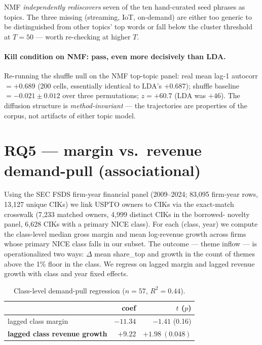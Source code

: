 \documentclass[11pt]{report}
\begin{document}
\noindent NMF \emph{independently rediscovers} seven of the ten hand-curated
seed phrases as topics. The three missing (streaming, IoT, on-demand) are
either too generic to be distinguished from other topics' top words or fall
below the cluster threshold at $T = 50$ --- worth re-checking at higher $T$.

\paragraph{Kill condition on NMF: pass, even more decisively than LDA.}
Re-running the shuffle null on the NMF top-topic panel: real mean lag-1
autocorr $= \mathbf{+0.689}$ (200 cells, essentially identical to LDA's
$+0.687$); shuffle baseline $= -0.021 \pm 0.012$ over three permutations;
\textbf{$z = +60.7$} (LDA was $+46$). The diffusion structure is
\emph{method-invariant} --- the trajectories are properties of the corpus, not
artifacts of either topic model.

\section{RQ5 --- margin vs.\ revenue demand-pull (associational)}
Using the SEC FSDS firm-year financial panel (2009--2024; 83{,}095 firm-year
rows, 13{,}127 unique CIKs) we link USPTO owners to CIKs via the exact-match
crosswalk (7{,}233 matched owners, 4{,}999 distinct CIKs in the borrowed-
novelty panel, 6{,}628 CIKs with a primary NICE class). For each (class,
year) we compute the class-level median gross margin and mean log-revenue
growth across firms whose primary NICE class falls in our subset. The
outcome --- theme inflow --- is operationalized two ways: $\Delta$ mean
share\_top and growth in the count of themes above the 1\% floor in the
class. We regress on lagged margin and lagged revenue growth with class and
year fixed effects.

\begin{table}[h]\centering\small
\caption{Class-level demand-pull regression ($n = 57$, $R^2 = 0.44$).}
\begin{tabular}{lrr}
\toprule
& coef & $t$ ($p$) \\
\midrule
lagged class margin             & $-11.34$ & $-1.41$ (0.16) \\
\textbf{lagged class revenue growth} & $\mathbf{+9.22}$ & $\mathbf{+1.98\ (0.048)}$ \\
\bottomrule
\end{tabular}
\end{table}
\end{document}
